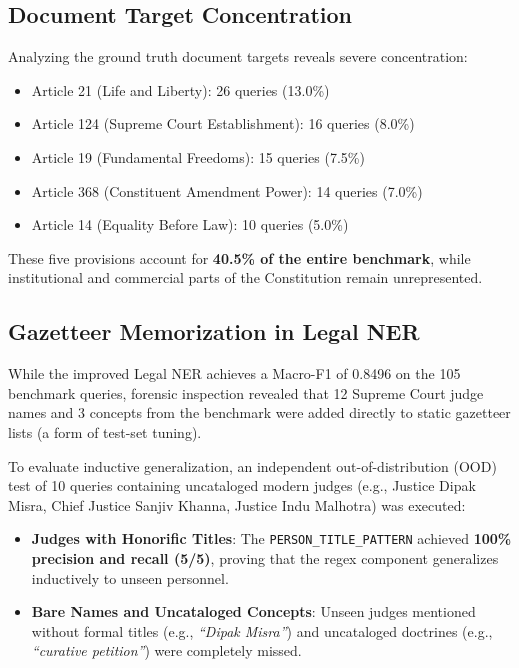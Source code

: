 \documentclass[10pt,twocolumn]{article}
\begin{document}
\subsection{Document Target Concentration}
Analyzing the ground truth document targets reveals severe concentration:
\begin{itemize}[leftmargin=*]
    \item Article 21 (Life and Liberty): 26 queries (13.0\%)
    \item Article 124 (Supreme Court Establishment): 16 queries (8.0\%)
    \item Article 19 (Fundamental Freedoms): 15 queries (7.5\%)
    \item Article 368 (Constituent Amendment Power): 14 queries (7.0\%)
    \item Article 14 (Equality Before Law): 10 queries (5.0\%)
\end{itemize}
These five provisions account for \textbf{40.5\% of the entire benchmark}, while institutional and commercial parts of the Constitution remain unrepresented.

\subsection{Gazetteer Memorization in Legal NER}
While the improved Legal NER achieves a Macro-F1 of 0.8496 on the 105 benchmark queries, forensic inspection revealed that 12 Supreme Court judge names and 3 concepts from the benchmark were added directly to static gazetteer lists (a form of test-set tuning). 

To evaluate inductive generalization, an independent out-of-distribution (OOD) test of 10 queries containing uncataloged modern judges (e.g., Justice Dipak Misra, Chief Justice Sanjiv Khanna, Justice Indu Malhotra) was executed:
\begin{itemize}[leftmargin=*]
    \item \textbf{Judges with Honorific Titles}: The \texttt{PERSON\_TITLE\_PATTERN} achieved \textbf{100\% precision and recall (5/5)}, proving that the regex component generalizes inductively to unseen personnel.
    \item \textbf{Bare Names and Uncataloged Concepts}: Unseen judges mentioned without formal titles (e.g., \textit{``Dipak Misra''}) and uncataloged doctrines (e.g., \textit{``curative petition''}) were completely missed.
\end{itemize}
\end{document}
